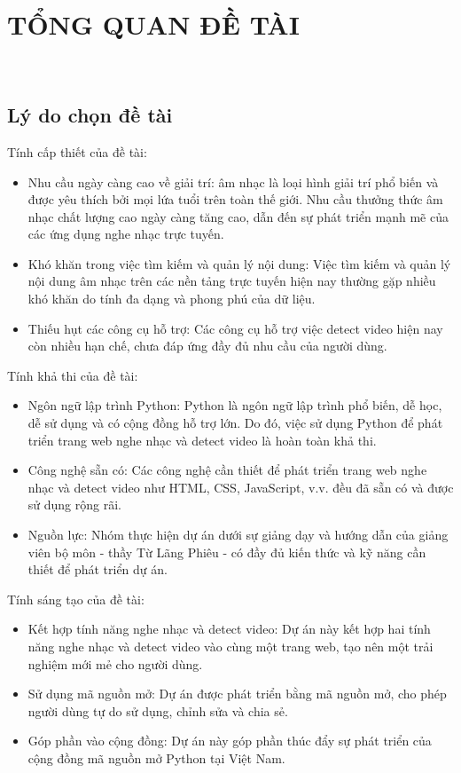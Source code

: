 \documentclass[a4paper]{article}
\begin{document}
\section{TỔNG QUAN ĐỀ TÀI}
\	\subsection{Lý do chọn đề tài}
	\indent Tính cấp thiết của đề tài:
\begin{itemize}
	\item Nhu cầu ngày càng cao về giải trí: âm nhạc là loại hình giải trí phổ biến và được yêu thích bởi mọi lứa tuổi trên toàn thế giới. Nhu cầu thưởng thức âm nhạc chất lượng cao ngày càng tăng cao, dẫn đến sự phát triển mạnh mẽ của các ứng dụng nghe nhạc trực tuyến.
    \item Khó khăn trong việc tìm kiếm và quản lý nội dung: Việc tìm kiếm và quản lý nội dung âm nhạc trên các nền tảng trực tuyến hiện nay thường gặp nhiều khó khăn do tính đa dạng và phong phú của dữ liệu.
    \item Thiếu hụt các công cụ hỗ trợ: Các công cụ hỗ trợ việc detect video hiện nay còn nhiều hạn chế, chưa đáp ứng đầy đủ nhu cầu của người dùng.
\end{itemize}
	\indent Tính khả thi của đề tài:
\begin{itemize}
	\item Ngôn ngữ lập trình Python: Python là ngôn ngữ lập trình phổ biến, dễ học, dễ sử dụng và có cộng đồng hỗ trợ lớn. Do đó, việc sử dụng Python để phát triển trang web nghe nhạc và detect video là hoàn toàn khả thi.
    \item Công nghệ sẵn có: Các công nghệ cần thiết để phát triển trang web nghe nhạc và detect video như HTML, CSS, JavaScript, v.v. đều đã sẵn có và được sử dụng rộng rãi.
    \item Nguồn lực: Nhóm thực hiện dự án dưới sự giảng dạy và hướng dẫn của giảng viên bộ môn - thầy Từ Lãng Phiêu - có đầy đủ kiến thức và kỹ năng cần thiết để phát triển dự án.
\end{itemize}
	\indent Tính sáng tạo của đề tài: 
\begin{itemize}
	\item Kết hợp tính năng nghe nhạc và detect video: Dự án này kết hợp hai tính năng nghe nhạc và detect video vào cùng một trang web, tạo nên một trải nghiệm mới mẻ cho người dùng.
    \item Sử dụng mã nguồn mở: Dự án được phát triển bằng mã nguồn mở, cho phép người dùng tự do sử dụng, chỉnh sửa và chia sẻ.
    \item Góp phần vào cộng đồng: Dự án này góp phần thúc đẩy sự phát triển của cộng đồng mã nguồn mở Python tại Việt Nam.
\end{itemize}
\end{document}
